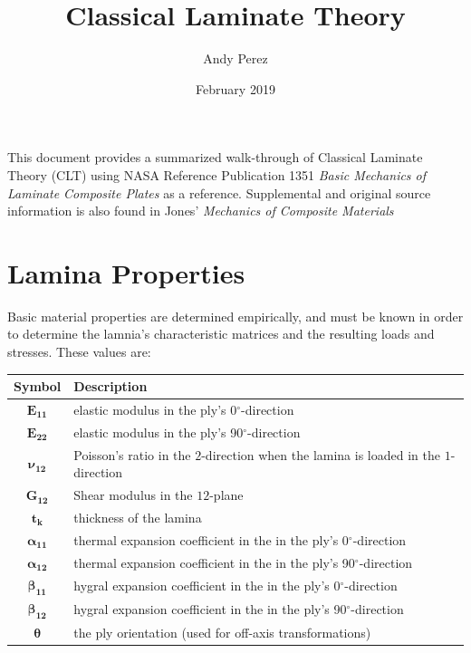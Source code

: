 \documentclass{article}
\title{Classical Laminate Theory}
\author{Andy Perez}
\date{February 2019}
\begin{document}
\setlength{\parindent}{0cm}
\renewcommand{\thefootnote}{\roman{footnote}}

\maketitle

This document provides a summarized walk-through of Classical Laminate Theory (CLT) using NASA Reference Publication 1351 \textit{Basic Mechanics of Laminate Composite Plates} \cite{nasa} as a reference. Supplemental and original source information is also found in Jones' \textit{Mechanics of Composite Materials} \cite{jones}


\section{Lamina Properties}
\label{sec:lamina_properties}
Basic material properties are determined empirically, and must be known in order to determine the lamnia's characteristic matrices and the resulting loads and stresses. These values are:
  \begin{center}
    \begin{table}[h!]
      \centering
      \label{tbl:lamprop}
      \vspace{1mm}
      \begin{tabular}{cl}
        Symbol & Description \\
        \hline \hline
        $\bm{E_{11}}$ & elastic modulus in the ply's 0$^{\circ}$-direction \\
        $\bm{E_{22}}$ & elastic modulus in the ply's 90$^{\circ}$-direction \\
        $\bm{\nu_{12}}$ & Poisson's ratio in the $2$-direction when the lamina is loaded in the $1$-direction \\
        $\bm{G_{12}}$ & Shear modulus in the $12$-plane \\
        $\bm{t_{k}}$ & thickness of the lamina \\
        $\bm{\alpha_{11}}$ & thermal expansion coefficient in the in the ply's 0$^{\circ}$-direction \\
        $\bm{\alpha_{12}}$ & thermal expansion coefficient in the in the ply's 90$^{\circ}$-direction \\
        $\bm{\beta_{11}}$ & hygral expansion coefficient in the in the ply's 0$^{\circ}$-direction \\
        $\bm{\beta_{12}}$ & hygral expansion coefficient in the in the ply's 90$^{\circ}$-direction \\
        $\bm{\theta}$ & the ply orientation (used for off-axis transformations)
      \end{tabular}
    \end{table}
  \end{center}
\end{document}
